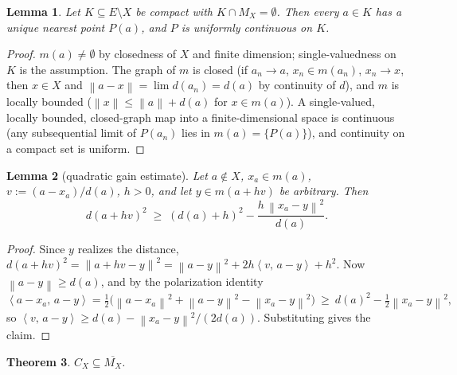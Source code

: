 \documentclass[11pt]{article}
\newtheorem{theorem}{Theorem}[section]
\newtheorem{lemma}[theorem]{Lemma}
\theoremstyle{remark}
\newcommand{\X}{X}
\newcommand{\sca}[2]{\left\langle #1,\, #2\right\rangle}
\newcommand{\norm}[1]{\left\lVert #1\right\rVert}
\newcommand{\Mx}{M_{\X}}
\newcommand{\Cx}{C_{\X}}
\begin{document}
\begin{lemma}\label{lem:footmap}
Let $K\subseteq E\setminus \X$ be compact with $K\cap\Mx=\emptyset$. Then every $a\in K$ has a
unique nearest point $P(a)$, and $P$ is uniformly continuous on $K$.
\end{lemma}

\begin{proof}
$m(a)\neq\emptyset$ by closedness of $\X$ and finite dimension; single-valuedness on $K$ is the
assumption. The graph of $m$ is closed (if $a_n\to a$, $x_n\in m(a_n)$, $x_n\to x$, then
$x\in \X$ and $\norm{a-x}=\lim d(a_n)=d(a)$ by continuity of $d$), and $m$ is locally bounded
($\norm{x}\le\norm a+d(a)$ for $x\in m(a)$). A single-valued, locally bounded, closed-graph map
into a finite-dimensional space is continuous (any subsequential limit of $P(a_n)$ lies in
$m(a)=\{P(a)\}$), and continuity on a compact set is uniform.
\end{proof}

\begin{lemma}[quadratic gain estimate]\label{lem:danskin}
Let $a\notin \X$, $x_a\in m(a)$, $v:=(a-x_a)/d(a)$, $h>0$, and let $y\in m(a+hv)$ be arbitrary.
Then
\[
 d(a+hv)^2\;\ge\;(d(a)+h)^2-\frac{h\,\norm{x_a-y}^2}{d(a)} .
\]
\end{lemma}

\begin{proof}
Since $y$ realizes the distance, $d(a+hv)^2=\norm{a+hv-y}^2=\norm{a-y}^2+2h\sca{v}{a-y}+h^2$.
Now $\norm{a-y}\ge d(a)$, and by the polarization identity
\[
 \sca{a-x_a}{a-y}=\tfrac12\bigl(\norm{a-x_a}^2+\norm{a-y}^2-\norm{x_a-y}^2\bigr)
 \ \ge\ d(a)^2-\tfrac12\norm{x_a-y}^2,
\]
so $\sca{v}{a-y}\ge d(a)-\norm{x_a-y}^2/(2d(a))$. Substituting gives the claim.
\end{proof}

\begin{theorem}\label{thm:fremlinapp}
$\Cx\subseteq\overline{\Mx}$.
\end{theorem}
\end{document}
